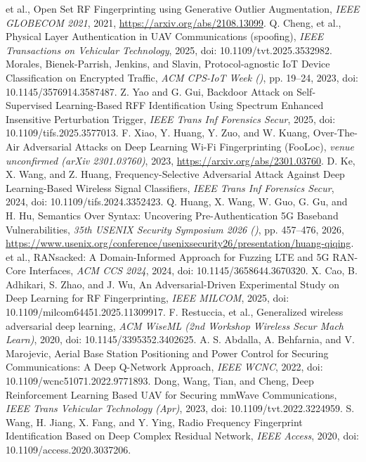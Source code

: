 et al., Open Set RF Fingerprinting using Generative Outlier Augmentation, \emph{IEEE GLOBECOM 2021}, 2021, \url{https://arxiv.org/abs/2108.13099}.
Q. Cheng, et al., Physical Layer Authentication in UAV Communications (spoofing), \emph{IEEE Transactions on Vehicular Technology}, 2025, doi: 10.1109/tvt.2025.3532982.
Morales, Bienek-Parrish, Jenkins, and Slavin, Protocol-agnostic IoT Device Classification on Encrypted Traffic, \emph{ACM CPS-IoT Week ()}, pp. 19--24, 2023, doi: 10.1145/3576914.3587487.
Z. Yao and G. Gui, Backdoor Attack on Self-Supervised Learning-Based RFF Identification Using Spectrum Enhanced Insensitive Perturbation Trigger, \emph{IEEE Trans Inf Forensics Secur}, 2025, doi: 10.1109/tifs.2025.3577013.
F. Xiao, Y. Huang, Y. Zuo, and W. Kuang, Over-The-Air Adversarial Attacks on Deep Learning Wi-Fi Fingerprinting (FooLoc), \emph{venue unconfirmed (arXiv 2301.03760)}, 2023, \url{https://arxiv.org/abs/2301.03760}.
D. Ke, X. Wang, and Z. Huang, Frequency-Selective Adversarial Attack Against Deep Learning-Based Wireless Signal Classifiers, \emph{IEEE Trans Inf Forensics Secur}, 2024, doi: 10.1109/tifs.2024.3352423.
Q. Huang, X. Wang, W. Guo, G. Gu, and H. Hu, Semantics Over Syntax: Uncovering Pre-Authentication 5G Baseband Vulnerabilities, \emph{35th USENIX Security Symposium 2026 ()}, pp. 457--476, 2026, \url{https://www.usenix.org/conference/usenixsecurity26/presentation/huang-qiqing}.
et al., RANsacked: A Domain-Informed Approach for Fuzzing LTE and 5G RAN-Core Interfaces, \emph{ACM CCS 2024}, 2024, doi: 10.1145/3658644.3670320.
X. Cao, B. Adhikari, S. Zhao, and J. Wu, An Adversarial-Driven Experimental Study on Deep Learning for RF Fingerprinting, \emph{IEEE MILCOM}, 2025, doi: 10.1109/milcom64451.2025.11309917.
F. Restuccia, et al., Generalized wireless adversarial deep learning, \emph{ACM WiseML (2nd Workshop Wireless Secur Mach Learn)}, 2020, doi: 10.1145/3395352.3402625.
A. S. Abdalla, A. Behfarnia, and V. Marojevic, Aerial Base Station Positioning and Power Control for Securing Communications: A Deep Q-Network Approach, \emph{IEEE WCNC}, 2022, doi: 10.1109/wcnc51071.2022.9771893.
Dong, Wang, Tian, and Cheng, Deep Reinforcement Learning Based UAV for Securing mmWave Communications, \emph{IEEE Trans Vehicular Technology (Apr)}, 2023, doi: 10.1109/tvt.2022.3224959.
S. Wang, H. Jiang, X. Fang, and Y. Ying, Radio Frequency Fingerprint Identification Based on Deep Complex Residual Network, \emph{IEEE Access}, 2020, doi: 10.1109/access.2020.3037206.
